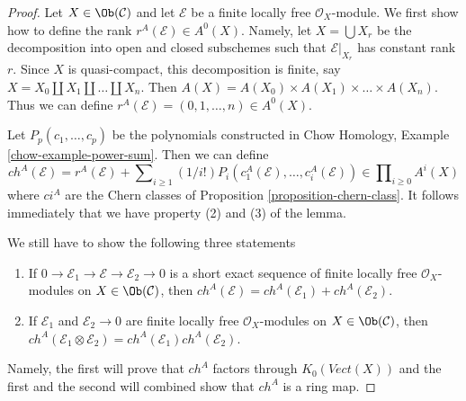 \begin{proof}
Let $X \in \Ob(\mathcal{C})$ and let $\mathcal{E}$ be a finite
locally free $\mathcal{O}_X$-module. We first show how to define
the rank $r^A(\mathcal{E}) \in A^0(X)$. Namely, let $X = \bigcup X_r$
be the decomposition into open and closed subschemes such that
$\mathcal{E}|_{X_r}$ has constant rank $r$. Since $X$ is quasi-compact, this
decomposition is finite, say $X = X_0 \amalg X_1 \amalg \ldots \amalg X_n$.
Then $A(X) = A(X_0) \times A(X_1) \times \ldots \times A(X_n)$. Thus we
can define $r^A(\mathcal{E}) = (0, 1, \ldots, n) \in A^0(X)$.

\medskip\noindent
Let $P_p(c_1, \ldots, c_p)$ be the polynomials constructed in
Chow Homology, Example \ref{chow-example-power-sum}.
Then we can define
$$
ch^A(\mathcal{E}) = r^A(\mathcal{E}) +
\sum\nolimits_{i \geq 1} (1/i!)
P_i(c^A_1(\mathcal{E}), \ldots, c^A_i(\mathcal{E}))
\in \prod\nolimits_{i \geq 0} A^i(X)
$$
where $ci^A$ are the Chern classes of
Proposition \ref{proposition-chern-class}.
It follows immediately that we have property (2) and (3) of the lemma.

\medskip\noindent
We still have to show the following three statements
\begin{enumerate}
\item If $0 \to \mathcal{E}_1 \to \mathcal{E} \to \mathcal{E}_2 \to 0$
is a short exact sequence of finite locally free $\mathcal{O}_X$-modules
on $X \in \Ob(\mathcal{C})$, then
$ch^A(\mathcal{E}) = ch^A(\mathcal{E}_1) + ch^A(\mathcal{E}_2)$.
\item If $\mathcal{E}_1$ and $\mathcal{E}_2 \to 0$ are finite locally free
$\mathcal{O}_X$-modules on $X \in \Ob(\mathcal{C})$, then
$ch^A(\mathcal{E}_1 \otimes \mathcal{E}_2) =
ch^A(\mathcal{E}_1) ch^A(\mathcal{E}_2)$.
\end{enumerate}
Namely, the first will prove that $ch^A$ factors through
$K_0(\textit{Vect}(X))$ and the first and the second will combined
show that $ch^A$ is a ring map.


\end{proof}
